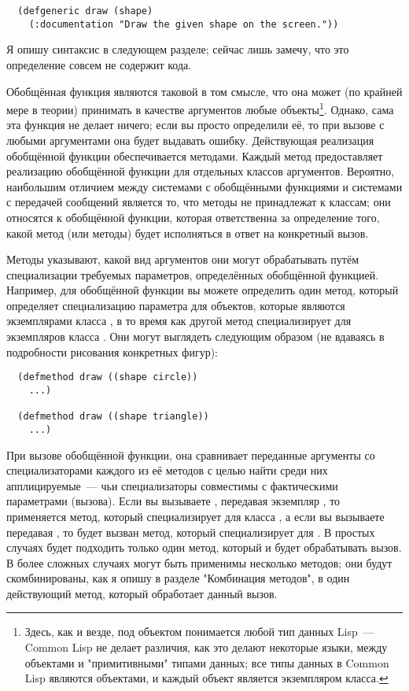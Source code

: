 \begin{lstlisting}
  (defgeneric draw (shape)
    (:documentation "Draw the given shape on the screen."))
\end{lstlisting}

Я опишу синтаксис  в следующем разделе; сейчас лишь замечу, что это
определение совсем не содержит кода.

Обобщённая функция являются таковой в том смысле, что она может (по крайней мере в теории)
принимать в качестве аргументов любые объекты\footnote{Здесь, как и везде, под объектом
  понимается любой тип данных Lisp~--- Common Lisp не делает различия, как это делают
  некоторые языки, между объектами и "примитивными" типами данных; все типы данных в
  Common Lisp являются объектами, и каждый объект является экземпляром класса.}.  Однако,
сама эта функция не делает ничего; если вы просто определили её, то при вызове с любыми
аргументами она будет выдавать ошибку. Действующая реализация обобщённой функции
обеспечивается методами. Каждый метод предоставляет реализацию обобщённой функции для
отдельных классов аргументов.  Вероятно, наибольшим отличием между системами с обобщёнными
функциями и системами с передачей сообщений является то, что методы не принадлежат к
классам; они относятся к обобщённой функции, которая ответственна за определение того,
какой метод (или методы) будет исполняться в ответ на конкретный вызов.

Методы указывают, какой вид аргументов они могут обрабатывать путём специализации
требуемых параметров, определённых обобщённой функцией.  Например, для обобщённой функции
 вы можете определить один метод, который определяет специализацию параметра
 для объектов, которые являются экземплярами класса , в то время
как другой метод специализирует  для экземпляров класса .  Они
могут выглядеть следующим образом (не вдаваясь в подробности рисования конкретных фигур):

\begin{lstlisting}
  (defmethod draw ((shape circle))
    ...)

  (defmethod draw ((shape triangle))
    ...)
\end{lstlisting}

При вызове обобщённой функции, она сравнивает переданные аргументы со специализаторами
каждого из её методов с целью найти среди них апплицируемые~--- чьи специализаторы
совместимы с фактическими параметрами (вызова). Если вы вызываете , передавая
экземпляр , то применяется метод, который специализирует  для
класса , а если вы вызываете передавая , то будет вызван
метод, который специализирует  для .  В простых случаях будет
подходить только один метод, который и будет обрабатывать вызов.  В более сложных случаях
могут быть применимы несколько методов; они будут скомбинированы, как я опишу в разделе
"Комбинация методов", в один действующий метод, который обработает данный вызов.

